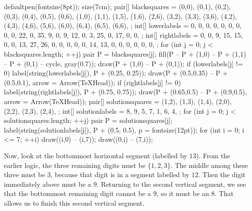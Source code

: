 	\begin{center}
		\begin{asy}
			defaultpen(fontsize(8pt));
			size(7cm);
			pair[] blacksquares = {
				(0,0), (0,1), (0,2), (0,3), (0,4), (0,5), (0,6),
				(1,0), (1,1), (1,5), (1,6),
				(2,6),
				(3,2), (3,3), (3,6),
				(4,2), (4,3), (4,6),
				(5,6),
				(6,0), (6,4), (6,5), (6,6),
			};
			int[] lowerlabels = {
				0, 0, 0, 0, 0, 0, 0,
				0, 0, 22, 0,
				35,
				9, 0, 9,
				12, 0, 3,
				25,
				0, 17, 0, 0,
			};
			int[] rightlabels = {
				0, 0, 9, 15, 15, 0, 0,
				13, 27, 26, 0,
				0,
				0, 0, 0,
				14, 13, 0,
				0,
				0, 0, 0, 0,
			};
			for (int j = 0; j < blacksquares.length; ++j) {
				pair P = blacksquares[j];
				fill(P -- P + (1,0) -- P + (1,1) -- P + (0,1) -- cycle, gray(0.7));
				draw(P + (1,0) -- P + (0,1));
				if (lowerlabels[j] != 0) {
					label(string(lowerlabels[j]), P + (0.25, 0.25));
					draw(P + (0.5,0.35) -- P + (0.5,0.1), arrow = Arrow(TeXHead));
				}
				if (rightlabels[j] != 0) {
					label(string(rightlabels[j]), P + (0.75, 0.75));
					draw(P + (0.65,0.5) -- P + (0.9,0.5), arrow = Arrow(TeXHead));
				}
			}
			pair[] solutionsquares = {
				(1,2), (1,3), (1,4),
				(2,0), (2,2), (2,3), (2,4),
			};
			int[] solutionlabels = {
				8, 9, 5,
				7, 1, 6, 4,
			};
			for (int j = 0; j < solutionsquares.length; ++j) {
				pair P = solutionsquares[j];
				label(string(solutionlabels[j]), P + (0.5, 0.5), p = fontsize(12pt));
			}
			for (int i = 0; i <= 7; ++i) {
				draw((i,0) -- (i,7));
				draw((0,i) -- (7,i));
			}
		\end{asy}
	\end{center}
	Now, look at the bottommost horizontal segment (labelled by $13$). From the earlier logic, the three remaining digits must be $\{1,2,3\}$. The middle among these three must be $3$, because that digit is in a segment labelled by $12$. Then the digit immediately above must be a $9$. Returning to the second vertical segment, we see that the bottommost remaining digit cannot be a $9$, so it must be an $8$. That allows us to finish this second vertical segment.
